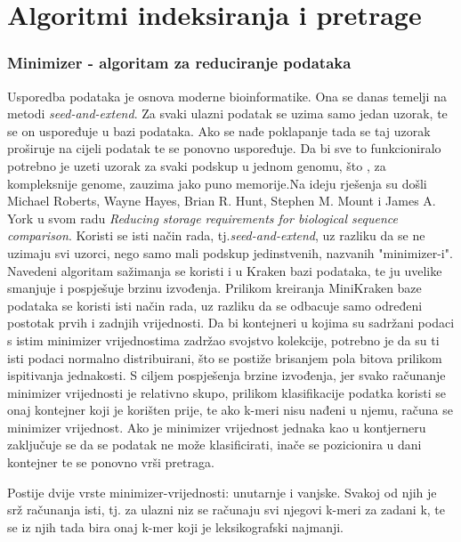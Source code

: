 \documentclass[times, utf8, zavrsni]{fer}
\begin{document}
{\chapter{Algoritmi indeksiranja i pretrage}
\subsection{Minimizer - algoritam za reduciranje podataka}
Usporedba podataka je osnova moderne bioinformatike. Ona se danas temelji na metodi \textit{seed-and-extend}. Za svaki ulazni podatak se uzima samo jedan uzorak, te se on uspoređuje u bazi podataka. Ako se nađe poklapanje tada se taj uzorak proširuje na cijeli podatak te se ponovno uspoređuje. Da bi sve to funkcioniralo potrebno je uzeti uzorak za svaki podskup u jednom genomu, što , za kompleksnije genome, zauzima jako puno memorije.Na ideju rješenja su došli Michael Roberts, Wayne Hayes, Brian R. Hunt, Stephen M. Mount i James A. York u svom radu \textit{Reducing storage requirements for biological sequence comparison}. Koristi se isti način rada, tj.\textit{seed-and-extend}, uz razliku da se ne uzimaju svi uzorci, nego samo mali podskup jedinstvenih, nazvanih "minimizer-i".
\\ Navedeni algoritam sažimanja se koristi i u Kraken bazi podataka, te ju uvelike smanjuje i pospješuje brzinu izvođenja. Prilikom kreiranja MiniKraken baze podataka se koristi isti način rada, uz razliku da se odbacuje samo određeni postotak prvih i zadnjih vrijednosti. Da bi kontejneri u kojima su sadržani podaci s istim minimizer vrijednostima zadržao svojstvo kolekcije, potrebno je da su ti isti podaci normalno distribuirani, što se postiže brisanjem pola bitova prilikom ispitivanja jednakosti. S ciljem pospješenja brzine izvođenja, jer svako računanje minimizer vrijednosti je relativno skupo, prilikom klasifikacije podatka koristi se onaj kontejner koji je korišten prije, te ako k-meri nisu nađeni u njemu, računa se minimizer vrijednost. Ako je minimizer vrijednost jednaka kao u kontjerneru zaključuje se da se podatak ne može klasificirati, inače se pozicionira u dani kontejner te se ponovno vrši pretraga.

Postije dvije vrste minimizer-vrijednosti: unutarnje i vanjske. Svakoj od njih je srž računanja isti, tj. za ulazni niz se računaju svi njegovi k-meri za zadani k, te se iz njih tada bira onaj k-mer koji je leksikografski najmanji. 

\begin{figure}[htbp]
	\centering
	

\end{figure}}
\end{document}
